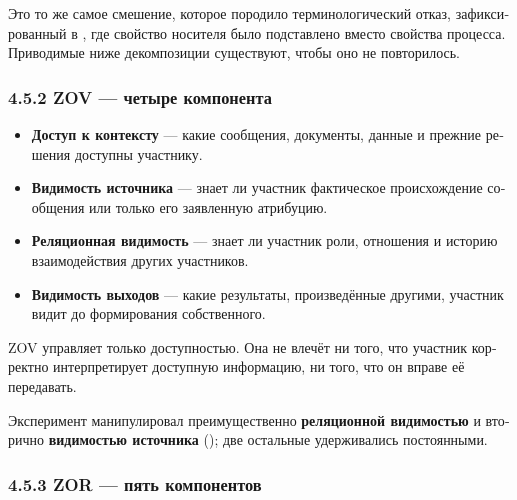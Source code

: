 \begin{russian}
Это то же самое смешение, которое породило терминологический отказ, зафиксированный в , где свойство носителя было подставлено вместо свойства процесса. Приводимые ниже декомпозиции существуют, чтобы оно не повторилось.


\subsubsection*{4.5.2 ZOV — четыре компонента}
\label{sec:ru:4.5.2}

\begin{itemize}
  \item \textbf{Доступ к контексту} — какие сообщения, документы, данные и прежние решения доступны участнику.
  \item \textbf{Видимость источника} — знает ли участник фактическое происхождение сообщения или только его заявленную атрибуцию.
  \item \textbf{Реляционная видимость} — знает ли участник роли, отношения и историю взаимодействия других участников.
  \item \textbf{Видимость выходов} — какие результаты, произведённые другими, участник видит до формирования собственного.
\end{itemize}
ZOV управляет только доступностью. Она не влечёт ни того, что участник корректно интерпретирует доступную информацию, ни того, что он вправе её передавать.

Эксперимент  манипулировал преимущественно \textbf{реляционной видимостью} и вторично \textbf{видимостью источника} (); две остальные удерживались постоянными.


\subsubsection*{4.5.3 ZOR — пять компонентов}
\label{sec:ru:4.5.3}


\end{russian}
